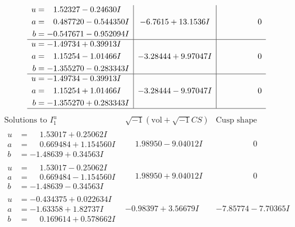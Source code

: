 \documentclass[1p]{elsarticle_modified}
\theoremstyle{definition}
\newcommand{\I}{\sqrt{-1}}
\begin{document}
$$\begin{array}{c|c|c}
\begin{aligned}
u &= \phantom{-}1.52327 - 0.24630 I \\
a &= \phantom{-}0.487720 - 0.544350 I \\
b &= -0.547671 - 0.952094 I\end{aligned}
 & -6.7615 + 13.1536 I & \phantom{-0.000000 } 0 \\ \hline\begin{aligned}
u &= -1.49734 + 0.39913 I \\
a &= \phantom{-}1.15254 - 1.01466 I \\
b &= -1.355270 - 0.283343 I\end{aligned}
 & -3.28444 + 9.97047 I & \phantom{-0.000000 } 0 \\ \hline\begin{aligned}
u &= -1.49734 - 0.39913 I \\
a &= \phantom{-}1.15254 + 1.01466 I \\
b &= -1.355270 + 0.283343 I\end{aligned}
 & -3.28444 - 9.97047 I & \phantom{-0.000000 } 0\\
 \hline 
 \end{array}$$\newpage$$\begin{array}{c|c|c}  
\text{Solutions to }I^u_{1}& \I (\text{vol} + \sqrt{-1}CS) & \text{Cusp shape}\\
 \hline 
\begin{aligned}
u &= \phantom{-}1.53017 + 0.25062 I \\
a &= \phantom{-}0.669484 + 1.154560 I \\
b &= -1.48639 + 0.34563 I\end{aligned}
 & \phantom{-}1.98950 - 9.04012 I & \phantom{-0.000000 } 0 \\ \hline\begin{aligned}
u &= \phantom{-}1.53017 - 0.25062 I \\
a &= \phantom{-}0.669484 - 1.154560 I \\
b &= -1.48639 - 0.34563 I\end{aligned}
 & \phantom{-}1.98950 + 9.04012 I & \phantom{-0.000000 } 0 \\ \hline\begin{aligned}
u &= -0.434375 + 0.022634 I \\
a &= -1.63358 + 1.82737 I \\
b &= \phantom{-}0.169614 + 0.578662 I\end{aligned}
 & -0.98397 + 3.56679 I & -7.85774 - 7.70365 I \\ \hline\begin{aligned}

\end{aligned}
\end{array}$$
\end{document}
